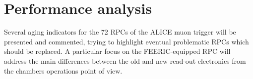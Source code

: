 

\section{Performance analysis}
Several aging indicators for the 72 RPCs of the ALICE muon trigger will be presented and commented, trying to highlight eventual problematic RPCs which should be replaced.
A particular focus on the FEERIC-equipped RPC will address the main differences between the old and new read-out electronics from the chambers operations point of view.

